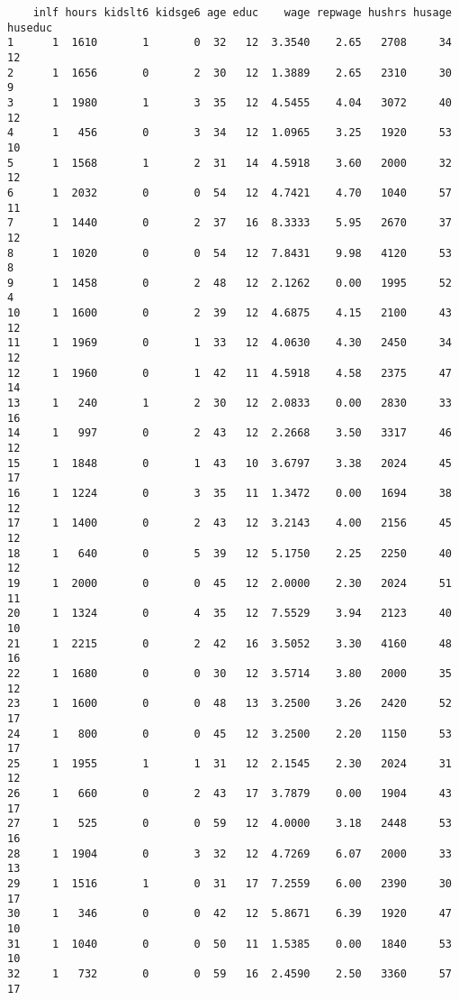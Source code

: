 \documentclass[
  letterpaper,
  DIV=11,
  numbers=noendperiod]{scrreprt}
\begin{document}
\begin{verbatim}
    inlf hours kidslt6 kidsge6 age educ    wage repwage hushrs husage huseduc
1      1  1610       1       0  32   12  3.3540    2.65   2708     34      12
2      1  1656       0       2  30   12  1.3889    2.65   2310     30       9
3      1  1980       1       3  35   12  4.5455    4.04   3072     40      12
4      1   456       0       3  34   12  1.0965    3.25   1920     53      10
5      1  1568       1       2  31   14  4.5918    3.60   2000     32      12
6      1  2032       0       0  54   12  4.7421    4.70   1040     57      11
7      1  1440       0       2  37   16  8.3333    5.95   2670     37      12
8      1  1020       0       0  54   12  7.8431    9.98   4120     53       8
9      1  1458       0       2  48   12  2.1262    0.00   1995     52       4
10     1  1600       0       2  39   12  4.6875    4.15   2100     43      12
11     1  1969       0       1  33   12  4.0630    4.30   2450     34      12
12     1  1960       0       1  42   11  4.5918    4.58   2375     47      14
13     1   240       1       2  30   12  2.0833    0.00   2830     33      16
14     1   997       0       2  43   12  2.2668    3.50   3317     46      12
15     1  1848       0       1  43   10  3.6797    3.38   2024     45      17
16     1  1224       0       3  35   11  1.3472    0.00   1694     38      12
17     1  1400       0       2  43   12  3.2143    4.00   2156     45      12
18     1   640       0       5  39   12  5.1750    2.25   2250     40      12
19     1  2000       0       0  45   12  2.0000    2.30   2024     51      11
20     1  1324       0       4  35   12  7.5529    3.94   2123     40      10
21     1  2215       0       2  42   16  3.5052    3.30   4160     48      16
22     1  1680       0       0  30   12  3.5714    3.80   2000     35      12
23     1  1600       0       0  48   13  3.2500    3.26   2420     52      17
24     1   800       0       0  45   12  3.2500    2.20   1150     53      17
25     1  1955       1       1  31   12  2.1545    2.30   2024     31      12
26     1   660       0       2  43   17  3.7879    0.00   1904     43      17
27     1   525       0       0  59   12  4.0000    3.18   2448     53      16
28     1  1904       0       3  32   12  4.7269    6.07   2000     33      13
29     1  1516       1       0  31   17  7.2559    6.00   2390     30      17
30     1   346       0       0  42   12  5.8671    6.39   1920     47      10
31     1  1040       0       0  50   11  1.5385    0.00   1840     53      10
32     1   732       0       0  59   16  2.4590    2.50   3360     57      17

\end{verbatim}
\end{document}
